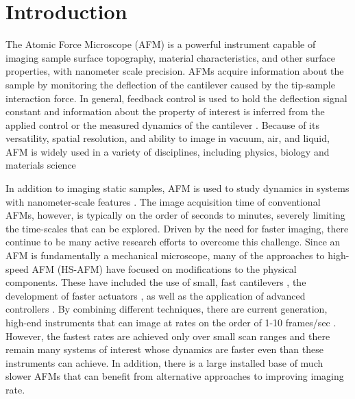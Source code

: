 \documentclass[twocolumn,oneside]{IEEEtran/IEEEtran}
\begin{document}
\section{Introduction}\label{sec:introduction}






The Atomic Force Microscope (AFM) is a powerful instrument capable of imaging
sample surface topography, material characteristics, and other surface
properties, with nanometer scale precision. AFMs acquire information about the sample by monitoring the deflection of the cantilever caused by the tip-sample interaction force. In general, 
feedback control is used to hold
the deflection signal constant and information about the property of interest is
inferred from the applied control or the measured dynamics of the cantilever
\cite{Abramovitch:2007gt}. Because of its versatility, spatial resolution, and
ability to image in vacuum, air, and liquid, AFM is widely used in a variety of
disciplines, including physics, biology and materials science
\cite{Dufrene:2017gm,Yang:2017im,Payton:2016hj,Altman:2015ic,Haase:2015eh}
	
In addition to imaging static samples, AFM is used to
study dynamics in systems with nanometer-scale features
\cite{Yang:2017im,Shibata:2017da,Shibata:2015jd,Ando:2014ja}. The image
acquisition time of conventional AFMs, however, is typically on the order of
seconds to minutes, severely limiting the time-scales that can be explored.
Driven by the need for faster imaging, there continue to be many active research
efforts to overcome this challenge. Since an AFM is fundamentally a mechanical
microscope, many of the approaches to high-speed AFM (HS-AFM) have focused on
modifications to the physical components. These have included the use of small,
fast cantilevers \cite{viani1999fast, braunsmann2010high,Adams:2016hg}, the
development of faster actuators \cite{Maroufi:2015gt,Yong:2012kd,Kenton:2012cm},
as well as the application of advanced controllers
\cite{Rana:2018es,Yong:2015gr,butterworth2010adaptive,salapaka2002high}. By
combining different techniques, there are current generation, high-end
instruments that can image at rates on the order of 1-10 frames/sec
\cite{Ando:2014ja}. However, the fastest rates are achieved only over small scan
ranges and there remain many systems of interest whose dynamics are faster even
than these instruments can achieve. In addition, there is a large installed base
of much slower AFMs that can benefit from alternative approaches to improving
imaging rate.
	
\end{document}

